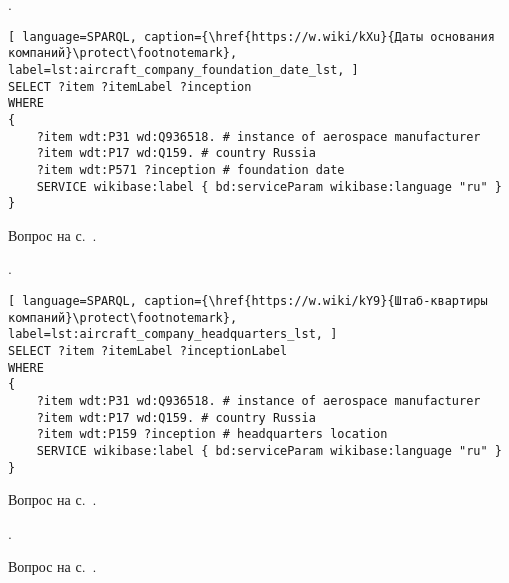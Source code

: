 \begin{task}
    \label{answer:aircraft_company_foundation_date}
    . 
    
	\begin{lstlisting}[ language=SPARQL, caption={\href{https://w.wiki/kXu}{Даты основания компаний}\protect\footnotemark}, label=lst:aircraft_company_foundation_date_lst, ]
SELECT ?item ?itemLabel ?inception
WHERE
{
    ?item wdt:P31 wd:Q936518. # instance of aerospace manufacturer
  	?item wdt:P17 wd:Q159. # country Russia
  	?item wdt:P571 ?inception # foundation date
    SERVICE wikibase:label { bd:serviceParam wikibase:language "ru" }
}
\end{lstlisting}
    
    \small{Вопрос на с.~\pageref{aircraft_question_2}.}
\end{task}

\begin{task}
    \label{answer:aircraft_company_headquarters}
    . 
    
	\begin{lstlisting}[ language=SPARQL, caption={\href{https://w.wiki/kY9}{Штаб-квартиры компаний}\protect\footnotemark}, label=lst:aircraft_company_headquarters_lst, ]
SELECT ?item ?itemLabel ?inceptionLabel
WHERE
{
    ?item wdt:P31 wd:Q936518. # instance of aerospace manufacturer
  	?item wdt:P17 wd:Q159. # country Russia
  	?item wdt:P159 ?inception # headquarters location
    SERVICE wikibase:label { bd:serviceParam wikibase:language "ru" }
}
\end{lstlisting}
    
    \small{Вопрос на с.~\pageref{aircraft_question_3}.}
\end{task}

\begin{task}
    \label{answer:aircraft_question_airship}
    . 
    
    \small{Вопрос на с.~\pageref{aircraft_question_4}.}
\end{task}

